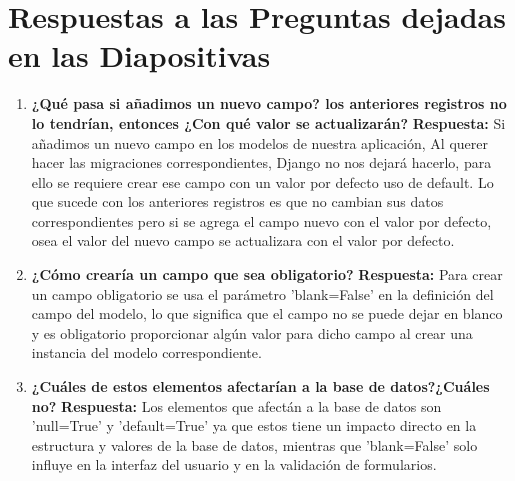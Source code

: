 \documentclass{article}
\begin{document}
	\section{Respuestas a las Preguntas dejadas en las Diapositivas}
  \begin{enumerate}
    \item \textbf{¿Qué pasa si añadimos un nuevo campo?  los anteriores registros no lo tendrían, entonces ¿Con qué valor se actualizarán?}
      \newline
      \textbf{Respuesta: }Si añadimos un nuevo campo en los modelos de nuestra aplicación, Al querer hacer las migraciones 
      correspondientes, Django no nos dejará hacerlo, para ello se requiere crear ese campo con un valor por defecto uso de default. Lo que sucede con los
      anteriores registros es que no cambian sus datos correspondientes pero si se agrega el campo nuevo con el valor por defecto, osea el valor del nuevo
      campo se actualizara con el valor por defecto.
    \item \textbf{¿Cómo crearía un campo que sea obligatorio?}
      \newline
      \textbf{Respuesta: }Para crear un campo obligatorio se usa el parámetro 'blank=False' en la definición del campo del modelo, lo que significa que el campo
      no se puede dejar en blanco y es obligatorio proporcionar algún valor para dicho campo al crear una instancia del modelo correspondiente.
    \item \textbf{¿Cuáles de estos elementos afectarían  a la base de datos?¿Cuáles no?}
      \newline
      \textbf{Respuesta: }Los elementos que afectán a la base de datos son 'null=True' y 'default=True' ya que estos tiene un impacto directo en la estructura y valores
      de la base de datos, mientras que 'blank=False' solo influye en la interfaz del usuario y en la validación de formularios.
  \end{enumerate}

\end{document}
